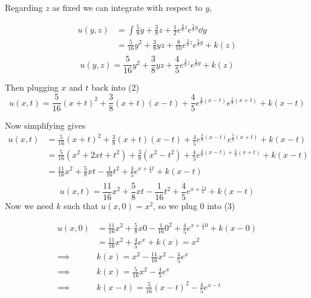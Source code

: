 \documentclass{article}
\begin{document}
Regarding $z$ as fixed we can integrate with respect to $y$,

\begin{align*}
  u(y,z) &= \int \frac{5}{8}y+\frac{3}{8}z
           +\frac{1}{2}e^{\frac{3}{8}z}e^{\frac{5}{8}y}\dd{y}\\
  &= \frac{5}{16}y^2+\frac{3}{8}yz
    +\frac{8}{10}e^{\frac{3}{8}z}e^{\frac{5}{8}y} + k(z)\\
\end{align*}
\begin{equation}  u(y,z)=  \frac{5}{16}y^2+\frac{3}{8}yz
  +\frac{4}{5}e^{\frac{3}{8}z}e^{\frac{5}{8}y} + k(z)
\end{equation}

Then plugging $x$ and $t$ back into (2)
\[u(x,t) = \frac{5}{16}(x+t)^2+\frac{3}{8}(x+t)(x-t)
           +\frac{4}{5}e^{\frac{3}{8}(x-t)}e^{\frac{5}{8}(x+t)} +
           k(x-t)\]

Now simplifying gives
\begin{align*}
  u(x,t) &= \frac{5}{16}(x+t)^2+\frac{3}{8}(x+t)(x-t)
           +\frac{4}{5}e^{\frac{3}{8}(x-t)}e^{\frac{5}{8}(x+t)} +
           k(x-t)\\
  &= \frac{5}{16}(x^2+2xt+t^2)+\frac{3}{8}(x^2-t^2)
           +\frac{4}{5}e^{\frac{3}{8}(x-t)+\frac{5}{8}(x+t)} +
    k(x-t)\\
  &= \frac{11}{16}x^2+\frac{5}{8}xt-\frac{1}{16}t^2
           +\frac{4}{5}e^{x +\frac{1}{4}t} +
           k(x-t)\\
\end{align*}
\begin{equation}
  u(x,t) = \frac{11}{16}x^2+\frac{5}{8}xt-\frac{1}{16}t^2
           +\frac{4}{5}e^{x +\frac{1}{4}t} +
           k(x-t)
  \end{equation}
Now we need $k$ such that $u(x,0)= x^2$, so we plug $0$ into (3)

\begin{align*}
  u(x,0) &= \frac{11}{16}x^2+\frac{5}{8}x0-\frac{1}{16}0^2
           +\frac{4}{5}e^{x +\frac{1}{4}0} +
           k(x-0)\\
  &= \frac{11}{16}x^2
           +\frac{4}{5}e^{x} +
    k(x) = x^2\\
  \implies& k(x) = x^2 - \frac{11}{16}x^2
            -\frac{4}{5}e^{x} \\
  \implies& k(x) = \frac{5}{16}x^2 -\frac{4}{5}e^{x} \\
  \implies& k(x-t) = \frac{5}{16}(x-t)^2 -\frac{4}{5}e^{x-t} \\
\end{align*}
\end{document}
